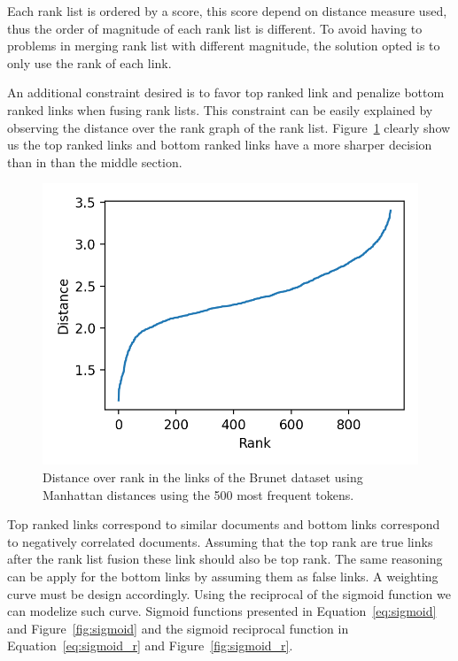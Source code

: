 Each rank list is ordered by a score, this score depend on distance measure used, thus the order of magnitude of each rank list is different.
To avoid having to problems in merging rank list with different magnitude, the solution opted is to only use the rank of each link.

An additional constraint desired is to favor top ranked link and penalize bottom ranked links when fusing rank lists.
This constraint can be easily explained by observing the distance over the rank graph of the rank list.
Figure~\ref{fig:distance_over_rank} clearly show us the top ranked links and bottom ranked links have a more sharper decision than in than the middle section.

\begin{figure}
  \centering
  \caption{Distance over rank in the links of the Brunet dataset using Manhattan distances using the 500 most frequent tokens.}
  \label{fig:distance_over_rank}
  \includegraphics[width=\linewidth]{img/distance_over_rank.png}
\end{figure}

Top ranked links correspond to similar documents and bottom links correspond to negatively correlated documents.
Assuming that the top rank are true links after the rank list fusion these link should also be top rank.
The same reasoning can be apply for the bottom links by assuming them as false links.
A weighting curve must be design accordingly.
Using the reciprocal of the sigmoid function we can modelize such curve.
Sigmoid functions presented in Equation~\ref{eq:sigmoid} and Figure~\ref{fig:sigmoid} and the sigmoid reciprocal function in Equation~\ref{eq:sigmoid_r} and Figure~\ref{fig:sigmoid_r}.

